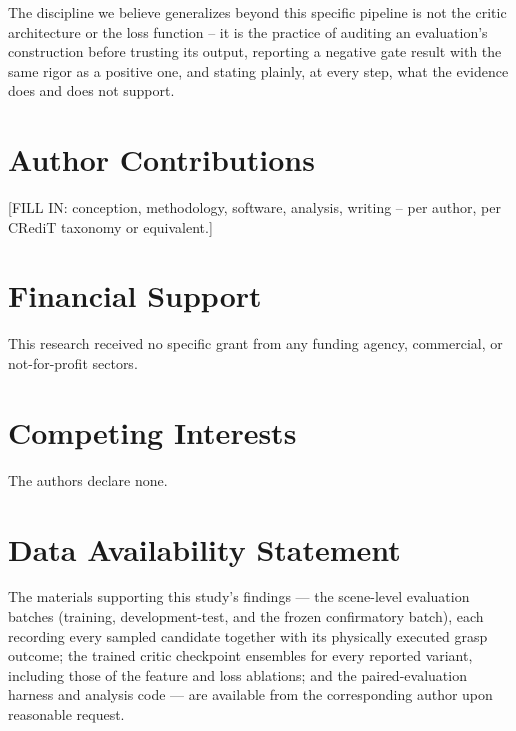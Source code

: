 \documentclass[journal]{IEEEtran}
\begin{document}
The discipline we believe generalizes beyond this specific pipeline is not
the critic architecture or the loss function -- it is the practice of
auditing an evaluation's construction before trusting its output, reporting
a negative gate result with the same rigor as a positive one, and stating
plainly, at every step, what the evidence does and does not support.


\section*{Author Contributions}
[FILL IN: conception, methodology, software, analysis, writing -- per
author, per CRediT taxonomy or equivalent.]

\section*{Financial Support}
This research received no specific grant from any funding agency,
commercial, or not-for-profit sectors.

\section*{Competing Interests}
The authors declare none.

\section*{Data Availability Statement}
The materials supporting this study's findings --- the scene-level
evaluation batches (training, development-test, and the frozen
confirmatory batch), each recording every sampled candidate together with
its physically executed grasp outcome; the trained critic checkpoint
ensembles for every reported variant, including those of the feature and
loss ablations; and the paired-evaluation harness and analysis code ---
are available from the corresponding author upon reasonable request.
\end{document}
